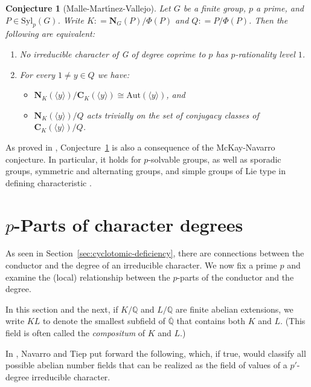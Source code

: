 \documentclass[12pt]{amsart}
\newtheorem{conjecture}[theorem]{Conjecture}
\theoremstyle{definition}
\numberwithin{equation}{section}
\newcommand{\Aut}{{\mathrm {Aut}}}
\newcommand{\Syl}{{\mathrm {Syl}}}
\newcommand{\QQ}{{\mathbb Q}}
\newcommand{\bC}{{\mathbf{C}}}
\newcommand{\bN}{{\mathbf{N}}}
\begin{document}
\begin{conjecture}[Malle-Mart\'{\i}nez-Vallejo]\label{conj:MMV}
Let $G$ be a finite group, $p$ a prime, and $P\in\Syl_p(G)$. Write
$K: = \bN_G(P)/\Phi(P)$ and $Q: = P/\Phi(P)$. Then the following are
equivalent:
\begin{enumerate}[\rm(i)]
\item No irreducible character of
G of degree coprime to $p$ has $p$-rationality level $1$.

\item For every $1\neq y \in Q$ we have:
\begin{itemize}
\item[(a)] $\bN_K(\langle y\rangle )/\bC_K(\langle y\rangle)\cong \Aut(\langle y\rangle)$, and

\item[(b)] $\bN_K(\langle y\rangle)/Q$ acts trivially on the set of conjugacy classes of
$\bC_K(\langle y\rangle)/Q$.
\end{itemize}
\end{enumerate}
\end{conjecture}

As proved in \cite[\S5]{MMV24}, Conjecture~\ref{conj:MMV} is also a
consequence of the McKay-Navarro conjecture. In particular, it holds
for $p$-solvable groups, as well as sporadic groups, symmetric and
alternating groups, and simple groups of Lie type in defining
characteristic \cite{BN21,Navarro04,R21}.


\section{$p$-Parts of character degrees}

As seen in Section~\ref{sec:cyclotomic-deficiency}, there are
connections between the conductor and the degree of an irreducible
character. We now fix a prime $p$ and examine the (local)
relationship between the $p$-parts of the conductor and the degree.

In this section and the next, if $K/\QQ$ and $L/\QQ$ are finite
abelian extensions, we write $KL$ to denote the smallest subfield of
$\overline{\QQ}$ that contains both $K$ and $L$. (This field is
often called the \emph{compositum} of $K$ and $L$.)

In \cite{Navarro-Tiep21}, Navarro and Tiep put forward the
following, which, if true, would classify all possible abelian
number fields that can be realized as the field of values of a
$p'$-degree irreducible character.
\end{document}
